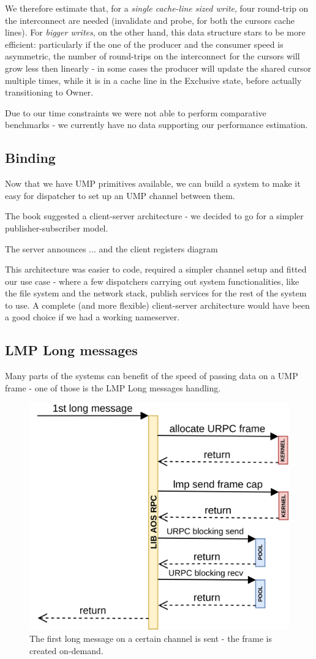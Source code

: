 \documentclass[a4paper,twoside,openright]{report}
\begin{document}
We therefore estimate that, for a \emph{single cache-line sized write}, four round-trip on the interconnect are needed (invalidate and probe, for both the cursors cache lines).
For \emph{bigger writes}, on the other hand, this data structure stars to be more efficient: particularly if the one of the producer and the consumer speed is asymmetric, the number of round-trips on the interconnect for the cursors will grow less then linearly - in some cases the producer will update the shared cursor multiple times, while it is in a cache line in the Exclusive state, before actually transitioning to Owner.

Due to our time constraints we were not able to perform comparative benchmarks - we currently have no data supporting our performance estimation.


\subsection{Binding}
Now that we have UMP primitives available, we can build a system to make it easy for dispatcher to set up an UMP channel between them.

The book suggested a client-server architecture - we decided to go for a simpler publisher-subscriber model.

The server announces ... and the client registers
diagram

This architecture was easier to code, required a simpler channel setup and fitted our use case - where a few dispatchers carrying out system functionalities, like the file system and the network stack, publish services for the rest of the system to use. A complete (and more flexible) client-server architecture would have been a good choice if we had a working nameserver.

\newpage
\subsection{LMP Long messages}
Many parts of the systems can benefit of the speed of passing data on a UMP frame - one of those is the LMP Long messages handling.

\begin{figure}[ht]
	\centering
	\includegraphics[width=0.7\linewidth]{assets/lmp-long-urpc-first}
	\caption{The first long message on a certain channel is sent - the frame is created on-demand.}
	\label{fig:lmp-long-urpc-first}
\end{figure}
\end{document}
